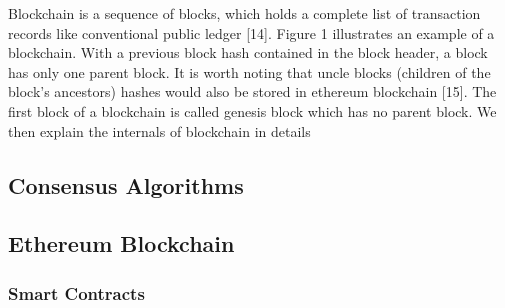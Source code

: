 Blockchain is a sequence of blocks, which holds a complete
list of transaction records like conventional public ledger [14]. Figure 1 illustrates an example of a blockchain. With a previous block hash contained in the block header, a block has only one parent block. It is worth noting that uncle blocks (children of the block’s ancestors) hashes would also be stored in ethereum blockchain [15]. The first block of a blockchain is called genesis block which has no parent block. We then explain the internals of blockchain in details



\subsection{Consensus Algorithms}

\subsection{Ethereum Blockchain}

\subsubsection{Smart Contracts}